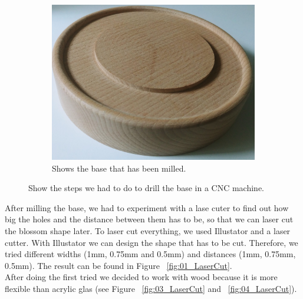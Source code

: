 \documentclass[doc.tex]{subfiles}
\begin{document}
\begin{figure}[H]
\begin{subfigure}{.45\textwidth}
                \includegraphics[scale=0.05]{images/process/base.jpg}
                \caption{Shows the base that has been milled.}
                \label{fig:blossomBase}
                \vspace{6mm}
            \end{subfigure}
            \caption{Show the steps we had to do to drill the base in a CNC machine.}
            \label{fig:laserCutTests}
        \end{figure}


        \noindent
        After milling the base, we had to experiment with a lase cuter to find out how big the holes and the distance between them 
        has to be, so that we can laser cut the blossom shape later. To laser cut everything, we used Illustator\cite{illustrator} 
        and a laser cutter. With Illustator we can design the shape that has to be cut. Therefore, we tried different widths (1mm, 
        0.75mm and 0.5mm) and distances (1mm, 0.75mm, 0.5mm). The result can be found in Figure ~\ref{fig:01_LaserCut}.\\
        \noindent
        After doing the first tried we decided to work with wood because it is more flexible 
        than acrylic glas (see Figure ~\ref{fig:03_LaserCut} and ~\ref{fig:04_LaserCut}).
\end{document}
